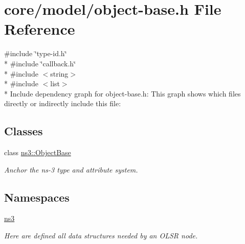 \hypertarget{object-base_8h}{}\section{core/model/object-\/base.h File Reference}
\label{object-base_8h}
{\ttfamily \#include \char`\"{}type-\/id.\+h\char`\"{}}\\*
{\ttfamily \#include \char`\"{}callback.\+h\char`\"{}}\\*
{\ttfamily \#include $<$string$>$}\\*
{\ttfamily \#include $<$list$>$}\\*
Include dependency graph for object-\/base.h\+:
This graph shows which files directly or indirectly include this file\+:
\subsection*{Classes}
\begin{DoxyCompactItemize}
\item 
class \hyperlink{classns3_1_1ObjectBase}{ns3\+::\+Object\+Base}
\begin{DoxyCompactList}\small\item\em Anchor the ns-\/3 type and attribute system. \end{DoxyCompactList}\end{DoxyCompactItemize}
\subsection*{Namespaces}
\begin{DoxyCompactItemize}
\item 
 \hyperlink{namespacens3}{ns3}
\begin{DoxyCompactList}\small\item\em Here are defined all data structures needed by an O\+L\+SR node. \end{DoxyCompactList}\end{DoxyCompactItemize}
